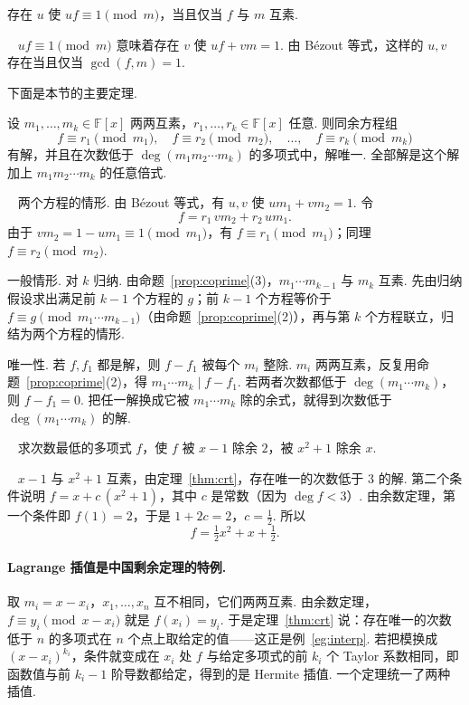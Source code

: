 \documentclass[lang=cn,10.5pt,scheme=chinese,toc=twocol,section,chinesefont=nofont,
twoside,citestyle=gb7714-2015,bibstyle=gb7714-2015]{elegantbook}
\newcommand*{\kaishu}{\CJKfamily{zhkai}}
\renewcommand*{\citshape}{\kaishu}
\DeclareRobustCommand{\textbf}[1]{{\lnsemiboldlatin\lnsemiboldcjk #1}}
\numberwithin{equation}{section}   %
\newcommand*{\lnlabel}[1]{{\sffamily\bfseries\color{black}#1}}
\renewenvironment{example}[1][]{%
	\refstepcounter{exam}%
	\par\noindent\lnlabel{\examplename\ \theexam\ifblank{#1}{}{\ #1}}\ \rmfamily}{%
	\par\ignorespacesafterend}
\renewenvironment{proof}{%
	\par\noindent\lnlabel{\proofname}\;\ \color{black!90}\cfs}{\par}
\renewenvironment{solution}{\par\noindent\lnlabel{\solutionname}\ \citshape}{\par}
\begin{document}
\begin{proposition}
  \label{prop:polyinv}
  存在 $u$ 使 $uf\equiv1\pmod m$，当且仅当 $f$ 与 $m$ 互素.
\end{proposition}
\begin{proof}
  $uf\equiv1\pmod m$ 意味着存在 $v$ 使 $uf+vm=1$. 由 Bézout 等式，这样的 $u,v$ 存在当且仅当 $\gcd(f,m)=1$.
\end{proof}

下面是本节的主要定理.

\begin{theorem}[中国剩余定理]\label{thm:crt}
  设 $m_1,\ldots,m_k\in\mathbb{F}[x]$ 两两互素，$r_1,\ldots,r_k\in\mathbb{F}[x]$ 任意. 则同余方程组
  \[f\equiv r_1\pmod{m_1},\quad f\equiv r_2\pmod{m_2},\quad\ldots,\quad f\equiv r_k\pmod{m_k}\]
  有解，并且在次数低于 $\deg(m_1m_2\cdots m_k)$ 的多项式中，解唯一. 全部解是这个解加上 $m_1m_2\cdots m_k$ 的任意倍式.
\end{theorem}
\begin{proof}
  \textbf{两个方程的情形.} 由 Bézout 等式，有 $u,v$ 使 $um_1+vm_2=1$. 令
  \[f=r_1\,vm_2+r_2\,um_1.\]
  由于 $vm_2=1-um_1\equiv1\pmod{m_1}$，有 $f\equiv r_1\pmod{m_1}$；同理 $f\equiv r_2\pmod{m_2}$.

  \textbf{一般情形.} 对 $k$ 归纳. 由命题~\ref{prop:coprime}(3)，$m_1\cdots m_{k-1}$ 与 $m_k$ 互素. 先由归纳假设求出满足前 $k-1$ 个方程的 $g$；前 $k-1$ 个方程等价于 $f\equiv g\pmod{m_1\cdots m_{k-1}}$（由命题~\ref{prop:coprime}(2)），再与第 $k$ 个方程联立，归结为两个方程的情形.

  \textbf{唯一性.} 若 $f,f_1$ 都是解，则 $f-f_1$ 被每个 $m_i$ 整除. $m_i$ 两两互素，反复用命题~\ref{prop:coprime}(2)，得 $m_1\cdots m_k\mid f-f_1$. 若两者次数都低于 $\deg(m_1\cdots m_k)$，则 $f-f_1=0$. 把任一解换成它被 $m_1\cdots m_k$ 除的余式，就得到次数低于 $\deg(m_1\cdots m_k)$ 的解.
\end{proof}

\begin{example}
  求次数最低的多项式 $f$，使 $f$ 被 $x-1$ 除余 $2$，被 $x^2+1$ 除余 $x$.
\end{example}
\begin{solution}
  $x-1$ 与 $x^2+1$ 互素，由定理~\ref{thm:crt}，存在唯一的次数低于 $3$ 的解. 第二个条件说明 $f=x+c\,(x^2+1)$，其中 $c$ 是常数（因为 $\deg f<3$）. 由余数定理，第一个条件即 $f(1)=2$，于是 $1+2c=2$，$c=\frac12$. 所以
  \[f=\tfrac12x^2+x+\tfrac12.\]
\end{solution}

\paragraph*{Lagrange 插值是中国剩余定理的特例.} 取 $m_i=x-x_i$，$x_1,\ldots,x_n$ 互不相同，它们两两互素. 由余数定理，$f\equiv y_i\pmod{x-x_i}$ 就是 $f(x_i)=y_i$. 于是定理~\ref{thm:crt} 说：存在唯一的次数低于 $n$ 的多项式在 $n$ 个点上取给定的值——这正是例~\ref{eg:interp}. 若把模换成 $(x-x_i)^{k_i}$，条件就变成在 $x_i$ 处 $f$ 与给定多项式的前 $k_i$ 个 Taylor 系数相同，即函数值与前 $k_i-1$ 阶导数都给定，得到的是 \textbf{Hermite 插值}. 一个定理统一了两种插值.
\end{document}
